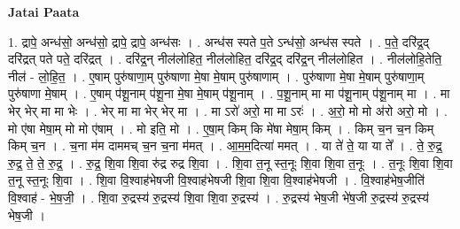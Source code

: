 \documentclass[17pt]{extarticle}
\begin{document}
\textbf{Jatai Paata} \newline

1. द्रापे॒ अन्ध॑सो॒ अन्ध॑सो॒ द्रापे॒ द्रापे॒ अन्ध॑सः । . अन्ध॑स स्पते प॒ते ऽन्ध॑सो॒ अन्ध॑स स्पते । . प॒ते॒ दरि॑द्र॒द् दरि॑द्रत् पते पते॒ दरि॑द्रत् । . दरि॑द्र॒न् नील॑लोहित॒ नील॑लोहित॒ दरि॑द्र॒द् दरि॑द्र॒न् नील॑लोहित । . नील॑लोहि॒तेति॒ नील॑ - लो॒हि॒त॒ । . ए॒षाम् पुरु॑षाणा॒म् पुरु॑षाणा मे॒षा मे॒षाम् पुरु॑षाणाम् । . पुरु॑षाणा मे॒षा मे॒षाम् पुरु॑षाणा॒म् पुरु॑षाणा मे॒षाम् । . ए॒षाम् प॑शू॒नाम् प॑शू॒ना मे॒षा मे॒षाम् प॑शू॒नाम् । . प॒शू॒नाम् मा मा प॑शू॒नाम् प॑शू॒नाम् मा । . मा भेर् भेर् मा मा भेः । . भेर् मा मा भेर् भेर् मा । . मा ऽरो॑ अरो॒ मा मा ऽरः॑ । . अ॒रो॒ मो मो अ॑रो अरो॒ मो । . मो ए॑षा मेषा॒म् मो मो ए॑षाम् । . मो इति॒ मो । . ए॒षा॒म् किम् कि मे॑षा मेषा॒म् किम् । . किम् च॒न च॒न किम् किम् च॒न । . च॒ना म॑म दाममच् च॒न च॒ना म॑मत् । . आ॒म॒म॒दित्या॑ ममत् । . या ते॑ ते॒ या या ते᳚ । . ते॒ रु॒द्र॒ रु॒द्र॒ ते॒ ते॒ रु॒द्र॒ । . रु॒द्र॒ शि॒वा शि॒वा रु॑द्र रुद्र शि॒वा । . शि॒वा त॒नू स्त॒नूः शि॒वा शि॒वा त॒नूः । . त॒नूः शि॒वा शि॒वा त॒नू स्त॒नूः शि॒वा । . शि॒वा वि॒श्वाह॑भेषजी वि॒श्वाह॑भेषजी शि॒वा शि॒वा वि॒श्वाह॑भेषजी । . वि॒श्वाह॑भेष॒जीति॑ वि॒श्वाह॑ - भे॒ष॒जी॒ । . शि॒वा रु॒द्रस्य॑ रु॒द्रस्य॑ शि॒वा शि॒वा रु॒द्रस्य॑ । . रु॒द्रस्य॑ भेष॒जी भे॑ष॒जी रु॒द्रस्य॑ रु॒द्रस्य॑ भेष॒जी । \newline
\end{document}
